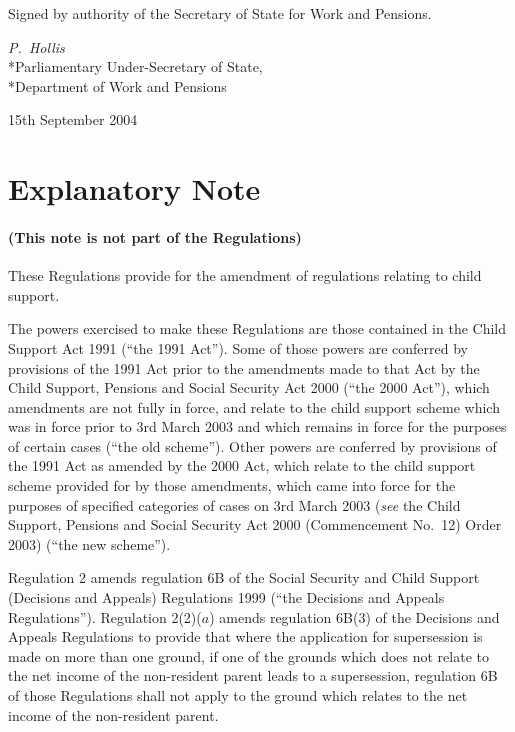 \documentclass[12pt,a4paper]{article}
\begin{document}
\bigskip

Signed 
by authority of the Secretary of State for Work and Pensions.

{\raggedleft
\emph{P.~Hollis}\\*Parliamentary Under-Secretary of State,\\*Department of Work and Pensions

}


15th September 2004

\small

\part{Explanatory Note}

\renewcommand\parthead{— Explanatory Note}

\subsection*{(This note is not part of the Regulations)}

These Regulations provide for the amendment of regulations relating to child support.

The powers exercised to make these Regulations are those contained in the Child Support Act 1991 (“the 1991 Act”). Some of those powers are conferred by provisions of the 1991 Act prior to the amendments made to that Act by the Child Support, Pensions and Social Security Act 2000 (“the 2000 Act”), which amendments are not fully in force, and relate to the child support scheme which was in force prior to 3rd March 2003 and which remains in force for the purposes of certain cases (“the old scheme”). Other powers are conferred by provisions of the 1991 Act as amended by the 2000 Act, which relate to the child support scheme provided for by those amendments, which came into force for the purposes of specified categories of cases on 3rd March 2003 (\emph{see} the Child Support, Pensions and Social Security Act 2000 (Commencement No.\ 12) Order 2003) (“the new scheme”).

Regulation 2 amends regulation 6B of the Social Security and Child Support (Decisions and Appeals) Regulations 1999 (“the Decisions and Appeals Regulations”). Regulation 2(2)($a$)  amends regulation 6B(3) of the Decisions and Appeals Regulations to provide that where the application for supersession is made on more than one ground, if one of the grounds which does not relate to the net income of the non-resident parent leads to a supersession, regulation 6B of those Regulations shall not apply to the ground which relates to the net income of the non-resident parent.
\end{document}
